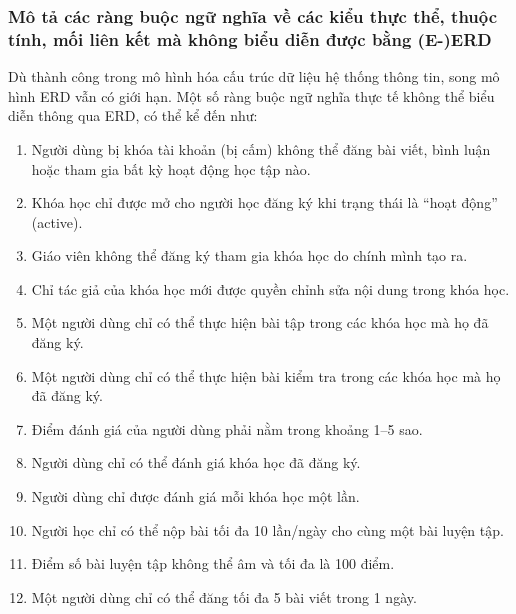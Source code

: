 \subsubsection{Mô tả các ràng buộc ngữ nghĩa về các kiểu thực thể, thuộc tính, mối liên kết mà không biểu diễn được bằng (E-)ERD}
Dù thành công trong mô hình hóa cấu trúc dữ liệu hệ thống thông tin, song mô hình ERD vẫn có giới hạn. Một số ràng buộc ngữ nghĩa thực tế không thể biểu diễn thông qua ERD, có thể kể đến như: \vspace{-0.3cm}
\begin{enumerate}
\item Người dùng bị khóa tài khoản (bị cấm) không thể đăng bài viết, bình luận hoặc tham gia bất kỳ hoạt động học tập nào. \vspace{-0.3cm}
\item Khóa học chỉ được mở cho người học đăng ký khi trạng thái là “hoạt động” (active). \vspace{-0.3cm}
\item Giáo viên không thể đăng ký tham gia khóa học do chính mình tạo ra. \vspace{-0.3cm}
\item Chỉ tác giả của khóa học mới được quyền chỉnh sửa nội dung trong khóa học. \vspace{-0.3cm}
\item Một người dùng chỉ có thể thực hiện bài tập trong các khóa học mà họ đã đăng ký. \vspace{-0.3cm}
\item Một người dùng chỉ có thể thực hiện bài kiểm tra trong các khóa học mà họ đã đăng ký. \vspace{-0.3cm}
\item Điểm đánh giá của người dùng phải nằm trong khoảng 1–5 sao. \vspace{-0.3cm}
\item Người dùng chỉ có thể đánh giá khóa học đã đăng ký. \vspace{-0.3cm}
\item Người dùng chỉ được đánh giá mỗi khóa học một lần. \vspace{-0.3cm}
\item Người học chỉ có thể nộp bài tối đa 10 lần/ngày cho cùng một bài luyện tập. \vspace{-0.3cm}
\item Điểm số bài luyện tập không thể âm và tối đa là 100 điểm. \vspace{-0.3cm}
\item Một người dùng chỉ có thể đăng tối đa 5 bài viết trong 1 ngày. \vspace{-0.3cm}
\end{enumerate}